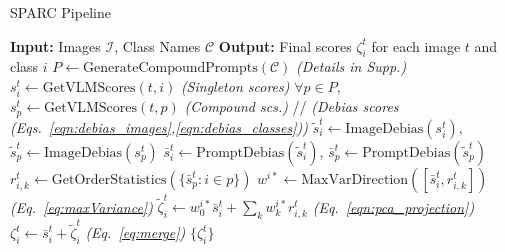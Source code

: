 \begin{algorithm}
\caption{SPARC Pipeline}
\label{alg:sparc}
\begin{algorithmic}
\STATE \textbf{Input:} Images $\mathcal{I}$, Class Names $\mathcal{C}$
\STATE \textbf{Output:} Final scores $\zeta^t_i$ for each image $t$ and class $i$
\STATE $P \gets \text{GenerateCompoundPrompts}(\mathcal{C})$ \hfill \textit{(Details in Supp.)}
   \STATE $s^t_i \gets \text{GetVLMScores}(t, i)$ \hfill\textit{(Singleton scores)}
   \STATE $\forall p \in P,$ $s^t_p \gets \text{GetVLMScores}(t, p)$ \hfill\textit{(Compound scs.)}
   \STATE // \textit{(Debias scores (Eqs.~\ref{eqn:debias_images},\ref{eqn:debias_classes}))}
   \STATE $\tilde{s}^t_i \gets \text{ImageDebias}(s^t_i)$, $\tilde{s}^t_p \gets \text{ImageDebias}(s^t_p)$
   \STATE $\bar{s}^t_i \gets \text{PromptDebias}(\tilde{s}^t_i)$,
   $\bar{s}^t_p \gets \text{PromptDebias}(\tilde{s}^t_p)$
       \STATE $r^t_{i,k} \gets \text{GetOrderStatistics}(\{\bar{s}^t_p: i \in p\})$
       \STATE $w^{i*} \gets \text{MaxVarDirection}([\bar{s}_i^t, r^t_{i,k}])$ \hfill 
 \textit{(Eq.~\ref{eq:maxVariance})}
       \STATE $\tilde{\zeta}^t_i \gets w^{i*}_0 \bar{s}^t_i + \sum_k w^{i*}_k r^t_{i,k}$ \hfill \textit{(Eq.~\ref{eqn:pca_projection})}
       \STATE $\zeta^t_i \gets \bar{s}^t_i + \tilde{\zeta}^t_i$  \hfill \textit{(Eq.~\ref{eq:merge})}
   \ENDFOR
\ENDFOR
\RETURN $\{\zeta^t_i\}$
\end{algorithmic}
\end{algorithm}
